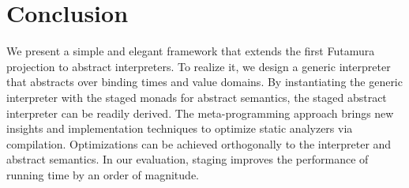 \section{Conclusion}

We present a simple and elegant framework that extends the first Futamura
projection to abstract interpreters.
To realize it, we design a generic interpreter that abstracts over binding
times and value domains. By instantiating the generic interpreter with the
staged monads for abstract semantics, the staged abstract interpreter can be
readily derived.  The meta-programming approach brings new insights and
implementation techniques to optimize static analyzers via compilation.
Optimizations can be achieved orthogonally to the interpreter and abstract
semantics.  In our evaluation, staging improves the performance of running time
by an order of magnitude.


